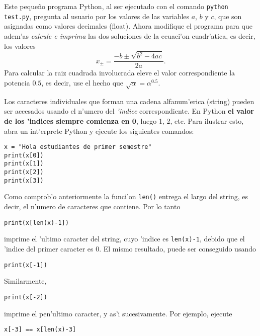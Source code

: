 \documentclass[11pt]{exam}
\begin{document}
\begin{questions}
\begin{itemize}
Este peque\~no programa Python, al ser ejecutado con el comando \texttt{python test.py}, pregunta al usuario por los valores de las variables $a$, $b$ y $c$, que son asignadas como valores decimales (float). Ahora modifique el programa para que adem'as \textit{calcule e imprima} las dos soluciones de la ecuaci'on cuadr'atica, es decir, los valores 
\begin{equation}
x_\pm=\frac{-b\pm\sqrt{b^2-4ac}}{2a}.
\end{equation}
Para calcular la raiz cuadrada involucrada eleve el valor correspondiente la potencia $0.5$, es decir, use el hecho que $\sqrt{\alpha}=\alpha^{0.5}$.
\end{itemize}

\item Los caracteres individuales que forman una cadena alfanum'erica (string) pueden ser accesados usando el n'umero del \textit{'indice} correspondiente. En Python \textbf{el valor de los 'indices siempre comienza en 0}, luego 1, 2, etc. Para ilustrar esto, abra un int'erprete Python y ejecute los siguientes comandos:

\begin{verbatim}
x = "Hola estudiantes de primer semestre"
print(x[0])
print(x[1])
print(x[2])
print(x[3])
\end{verbatim}

\item Como comprob'o anteriormente la funci'on \texttt{len()} entrega el largo del string, es decir, el n'umero de caracteres que contiene. Por lo tanto

\begin{verbatim}
print(x[len(x)-1])
\end{verbatim}

imprime el 'ultimo caracter del string, cuyo 'indice es \texttt{len(x)-1}, debido que el 'indice del primer caracter es 0. El mismo resultado, puede ser conseguido usando

\begin{verbatim}
print(x[-1])
\end{verbatim}

Similarmente,

\begin{verbatim}
print(x[-2])
\end{verbatim}

imprime el pen'ultimo caracter, y as'i sucesivamente. Por ejemplo, ejecute

\begin{verbatim}
x[-3] == x[len(x)-3]
\end{verbatim}


\end{questions}
\end{document}
